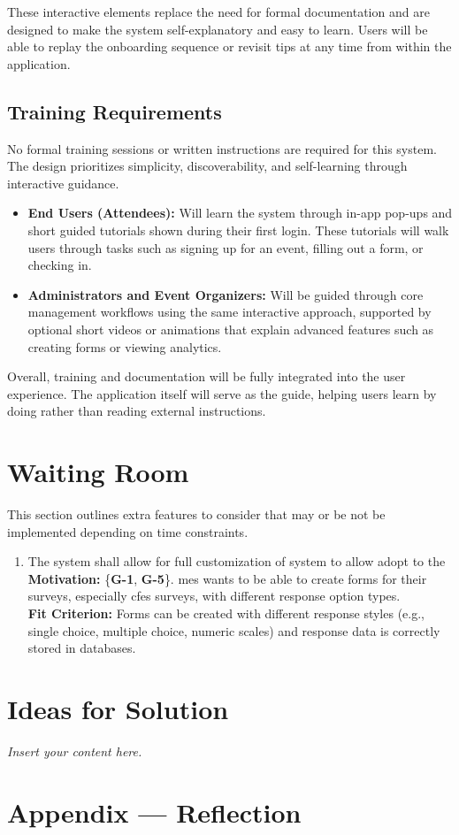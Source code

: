 \documentclass[12pt]{article}
\newcommand{\lips}{\textit{Insert your content here.}}
\begin{document}
These interactive elements replace the need for formal documentation and are designed to make the system self-explanatory and easy to learn.
Users will be able to replay the onboarding sequence or revisit tips at any time from within the application.

\subsection{Training Requirements}

No formal training sessions or written instructions are required for this system.
The design prioritizes simplicity, discoverability, and self-learning through interactive guidance.

\begin{itemize}
    \item \textbf{End Users (Attendees):}
    Will learn the system through in-app pop-ups and short guided tutorials shown during their first login.
    These tutorials will walk users through tasks such as signing up for an event, filling out a form, or checking in.

    \item \textbf{Administrators and Event Organizers:}
    Will be guided through core management workflows using the same interactive approach, supported by optional short videos or animations that explain advanced features such as creating forms or viewing analytics.
\end{itemize}

Overall, training and documentation will be fully integrated into the user experience.
The application itself will serve as the guide, helping users learn by doing rather than reading external instructions.


\section{Waiting Room}

This section outlines extra features to consider that may or be not be implemented depending on time constraints.

\begin{enumerate}[align=left,
  leftmargin=*,
  labelsep=1em,
  itemindent=0em,
  label=\bfseries WR-\arabic*:,
  ref=\bfseries WR-\arabic*]
  \item \label{FR1} The system shall allow for full customization of system to allow adopt to the \\[2mm]
    {\bf Motivation:} \{\textbf{G-1}, \textbf{G-5}\}. \Gls{mes} wants to be able to create forms for their surveys,
    especially \gls{cfes} surveys, with different response option types.\\
    {\bf Fit Criterion:} Forms can be created with different response styles (e.g., single choice, multiple choice,
    numeric scales) and response data is correctly stored in databases.
\end{enumerate}


\section{Ideas for Solution}
\lips

\newpage{}
\section*{Appendix --- Reflection}




\end{document}
